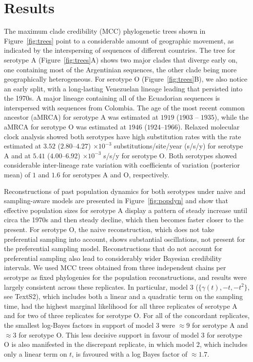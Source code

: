 \documentclass[10pt]{article}
\begin{document}
\section*{Results}

The maximum clade credibility (MCC) phylogenetic trees shown in Figure~\ref{fig:trees} point to a considerable amount of geographic movement, as indicated by the interspersing of sequences of different countries.
The tree for serotype A (Figure~\ref{fig:trees}A) shows two major clades that diverge early on, one containing most of the Argentinian sequences, the other clade being more geographically heterogeneous.
For serotype O (Figure~\ref{fig:trees}B), we also notice an early split, with a long-lasting Venezuelan lineage leading that persisted into the 1970s. 
A major lineage containing all of the Ecuadorian sequences is interspersed with sequences from Colombia.
The age of the most recent common ancestor (aMRCA) for serotype A was estimated at $1919$ ($1903$ -- $1935$), while the aMRCA for serotype O was estimated at $1946$ ($1924$--$1966$).
Relaxed molecular clock analysis showed both serotypes have high substitution rates with the rate estimated at $3.52$ ($2.80$--$4.27$) $\times 10^{-3}$ substitutions/site/year (s/s/y) for serotype A  and at  $5.41$ ($4.00$--$6.92$) $\times 10^{-3}$ s/s/y for serotype O.
Both serotypes showed considerable inter-lineage rate variation with coefficients of variation (posterior mean) of $1$ and $1.6$ for serotypes A and O, respectively.

Reconstructions of past population dynamics for both serotypes under naive and sampling-aware models are presented in Figure~\ref{fig:popdyn} and show that effective population sizes for serotype A display a pattern of steady increase until circa the 1970s and then steady decline, which then becomes faster closer to the present.
For serotype O, the naive reconstruction, which does not take preferential sampling into account, shows substantial oscillations, not present for the preferential sampling model.
Reconstructions that do not account for preferential sampling also lead to considerably wider Bayesian credibility intervals.
We used MCC trees obtained from three independent chains per serotype as fixed phylogenies for the population reconstructions, and results were largely consistent across these replicates.
In particular, model 3 ($\{\gamma(t), -t, -t^2\}$, see TextS2), which includes both a linear and a quadratic term on the sampling time, had the highest marginal likelihood for all three replicates of serotype A and for two of three replicates for serotype O.
For all of the concordant replicates, the smallest log-Bayes factors in support of model 3 were $\approx 9$ for serotype A and $\approx 3$ for serotype O.
This less decisive support in favour of model 3 for serotype O is also manifested in the discrepant replicate, in which model 2, which includes only a linear term on $t$, is favoured with a log Bayes factor of $\approx 1.7$.
\end{document}
